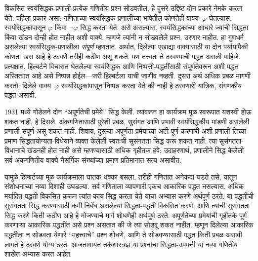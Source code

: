 विकसित स्वयंसिद्धक-प्रणाली प्रत्येक गणितीय प्रश्न सोडवतील, हे दुसरे
उद्दिष्ट दोन प्रकारे नेमके करता येते. पहिला प्रकार असा: गणिताच्या
स्वयंसिद्धक-प्रणालीच्या भाषेतील कोणतेही वाक्य~$\varphi$ घेतल्यास,
स्वयंसिद्धकांपासून $\varphi$ किंवा $\lnot \varphi$ सिद्ध करता येते. असे असल्यास,
स्वयंसिद्धकांच्या आधारे ज्यांची सिद्धता किंवा खंडन दोन्ही होत नाहीत अशी
वाक्ये, म्हणजे त्यांनी न सोडवलेले प्रश्न, उरणार नाहीत. हा गुणधर्म
असलेल्या स्वयंसिद्धक-प्रणालीला \emph{संपूर्ण} म्हणतात. अर्थात, दिलेल्या
एखाद्या वाक्यासाठी या दोन पर्यायांपैकी कोणता खरा आहे हे ठरवणे तरीही
कठीण असू शकते. पण तत्त्वतः ते ठरवण्याची पद्धत असली पाहिजे. प्रत्यक्षात,
हिल्बर्टने विचारात घेतलेल्या स्वयंसिद्धक आणि निष्पत्ती-पद्धतींसाठी
संपूर्णतेवरून अशी पद्धत अस्तित्वात आहे असे निष्पन्न होईल---जरी हिल्बर्टला
याची जाणीव नव्हती. दुसरा अर्थ अधिक प्रबळ मागणी करतो: दिलेले
वाक्य~$\varphi$ स्वयंसिद्धकांपासून निष्पन्न करता येते की नाही हे ठरवणारी
यांत्रिक, संगणकीय पद्धत असावी.

1931 मध्ये गोडेलने दोन ``अपूर्णतेची प्रमेये'' सिद्ध केली. त्यांवरून
हा कार्यक्रम मूळ स्वरूपात यशस्वी होऊ शकत नाही, हे दिसले. अंकगणितासाठी
पुरेशी प्रबळ, सुसंगत आणि प्रभावी स्वयंसिद्धकीय मांडणी असलेली प्रणाली
संपूर्ण असू शकत नाही. शिवाय, दुसऱ्या अपूर्णता प्रमेयाच्या अटी पूर्ण करणारी
अशी प्रणाली तिच्या प्रमाण सिद्धतायोग्यता-विधेयाने व्यक्त केलेली स्वतःची
सुसंगतता सिद्ध करू शकत नाही. त्या सुसंगतता-विधानाचे खंडनही होत नाही असे
म्हणण्यासाठी अधिक गृहीतक हवे; उदाहरणार्थ, प्रणालीने सिद्ध केलेली सर्व
अंकगणितीय वाक्ये नैसर्गिक संख्यांच्या प्रमाण प्रतिमानात सत्य असावीत.


यामुळे हिल्बर्टच्या मूळ कार्यक्रमाला घातक धक्का बसला. तरीही गणितात
अनेकदा घडते तसे, यातून संशोधनाच्या नव्या दिशाही उघडल्या. सर्व गणिताला
व्यापणारी एकच आकारिक पद्धत नसल्यास, अधिक मर्यादित पद्धती विकसित करून
त्यांत काय सिद्ध करता येते याचा अभ्यास करणे अर्थपूर्ण ठरते. या पद्धतींची
सुसंगतता सिद्ध करण्यासाठी कमी निर्बंध असलेल्या सिद्धता-पद्धती विकसित
करणे, आणि त्यांची सुसंगतता सिद्ध करणे किती कठीण आहे हे मोजण्याचे मार्ग
शोधणेही अर्थपूर्ण ठरते. अपूर्णतेच्या प्रमेयांची गृहीतके पूर्ण करणाऱ्या
आकारिक पद्धतींत असे प्रश्न असतात की जे त्या सोडवू शकत नाहीत. म्हणून
दिलेल्या आकारिक पद्धतीला न सोडवता येणारे ``महत्त्वाचे'' प्रश्न शोधणे,
आणि ते सोडवण्यासाठी पद्धत किती प्रबळ असावी लागते हे ठरवणे योग्य ठरते.
आजतागायत तर्कशास्त्रज्ञ या प्रश्नांचा सिद्धता-उपपत्ती या नव्या
गणितीय शाखेत अभ्यास करत आहेत.












